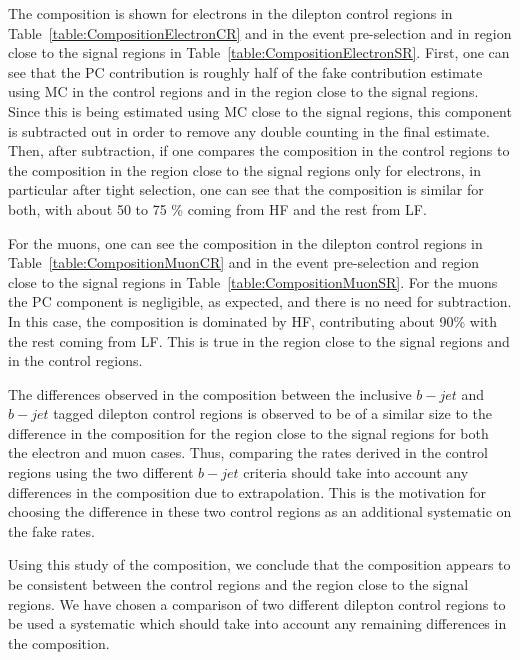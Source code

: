 The composition is shown for electrons in the dilepton control 
regions in Table~\ref{table:CompositionElectronCR} and in the event pre-selection and in region close to the signal regions in Table~\ref{table:CompositionElectronSR}.
First, one can see that the PC contribution is roughly half of the fake contribution
estimate using MC
in the control regions and in the region close to the signal regions. Since this is being estimated
using MC close to the signal regions, 
this component is subtracted out in order to remove any double counting
in the final estimate. Then, after subtraction,
if one compares the composition in the control regions
to the composition in the region close to the signal regions only for electrons, 
in particular after tight selection, one can see that 
the composition is similar for both, 
with about 50 to 75 \% coming from HF and the rest from LF.

For the muons, one can see the composition in the dilepton control regions in 
Table~\ref{table:CompositionMuonCR} and in the event pre-selection
and region close to the signal regions in Table~\ref{table:CompositionMuonSR}. For the muons the PC
component is negligible, as expected, and there is no need for subtraction.
In this case, the composition is dominated by HF, contributing about 90\% with the
rest coming from LF.  This is true in the region close to the signal regions and in the control regions.

The differences observed in the composition between the inclusive $b-jet$ and $b-jet$ 
tagged dilepton control regions is observed to be of a similar size
to the difference in the composition for the region close to the signal regions for both the electron 
and muon cases.
Thus, comparing the rates derived in the control regions using the two different
$b-jet$ criteria should take into account any differences in the composition due
to extrapolation. This is the motivation for choosing the difference in these two 
control regions as an additional systematic on the fake rates.

Using this study of the composition, we conclude that the composition appears to be
consistent between the control regions and the region close to the signal regions.  We have chosen 
a comparison of two different dilepton control regions to be used a systematic
which should take into account any remaining differences in the composition.

